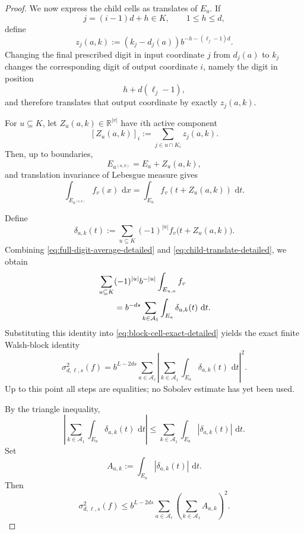 \documentclass[11pt]{article}
\newcommand{\dd}{\,\mathrm d}
\begin{document}
\begin{proof}
We now express the child cells as translates of $E_a$.
If
\[
 j=(i-1)d+h\in K,
 \qquad 1\le h\le d,
\]
define
\begin{equation}\label{eq:z-aj-detailed}
 z_j(a,k)
 :=
 (k_j-d_j(a))b^{-h-(\ell_j-1)d}.
\end{equation}
Changing the final prescribed digit in input coordinate $j$ from
$d_j(a)$ to $k_j$ changes the corresponding digit of output
coordinate $i$, namely the digit in position
\[
 h+d(\ell_j-1),
\]
and therefore translates that output coordinate by exactly
$z_j(a,k)$.

For $u\subseteq K$, let $Z_u(a,k)\in\mathbb R^{|v|}$ have
$i$th active component
\[
 [Z_u(a,k)]_i
 :=
 \sum_{j\in u\cap K_i}z_j(a,k).
\]
Then, up to boundaries,
\[
 E_{a^{(u,k)}}=E_a+Z_u(a,k),
\]
and translation invariance of Lebesgue measure gives
\begin{equation}\label{eq:child-translate-detailed}
 \int_{E_{a^{(u,k)}}}f_v(x)\,\dd x
 =
 \int_{E_a}f_v(t+Z_u(a,k))\,\dd t.
\end{equation}

Define
\begin{equation}\label{eq:delta-explicit-detailed}
 \delta_{a,k}(t)
 :=
 \sum_{u\subseteq K}(-1)^{|u|}
 f_v\bigl(t+Z_u(a,k)\bigr).
\end{equation}
Combining
\eqref{eq:full-digit-average-detailed} and
\eqref{eq:child-translate-detailed}, we obtain
\begin{align}
 &\sum_{u\subseteq K}
 (-1)^{|u|}b^{-|u|}
 \int_{E_{u,a}}f_v
 \notag\\
 &\qquad
 =
 b^{-ds}
 \sum_{k\in\mathcal A_1}
 \int_{E_a}\delta_{a,k}(t)\,\dd t.
 \label{eq:block-difference-rearrangement-detailed}
\end{align}
Substituting this identity into
\eqref{eq:block-cell-exact-detailed} yields the exact finite
Walsh-block identity
\begin{equation}\label{eq:block-exact-detailed}
 \sigma_{d,\boldsymbol\ell,s}^2(f)
 =
 b^{L-2ds}
 \sum_{a\in\mathcal A_{\boldsymbol\ell}}
 \left|
   \sum_{k\in\mathcal A_1}
   \int_{E_a}\delta_{a,k}(t)\,\dd t
 \right|^2.
\end{equation}
Up to this point all steps are equalities; no Sobolev estimate has
yet been used.

By the triangle inequality,
\[
 \left|
   \sum_{k\in\mathcal A_1}
   \int_{E_a}\delta_{a,k}(t)\,\dd t
 \right|
 \le
 \sum_{k\in\mathcal A_1}
 \int_{E_a}|\delta_{a,k}(t)|\,\dd t.
\]
Set
\[
 A_{a,k}
 :=
 \int_{E_a}|\delta_{a,k}(t)|\,\dd t.
\]
Then
\begin{equation}\label{eq:before-max-detailed}
 \sigma_{d,\boldsymbol\ell,s}^2(f)
 \le
 b^{L-2ds}
 \sum_{a\in\mathcal A_{\boldsymbol\ell}}
 \left(
   \sum_{k\in\mathcal A_1}A_{a,k}
 \right)^2.
\end{equation}


\end{proof}
\end{document}
